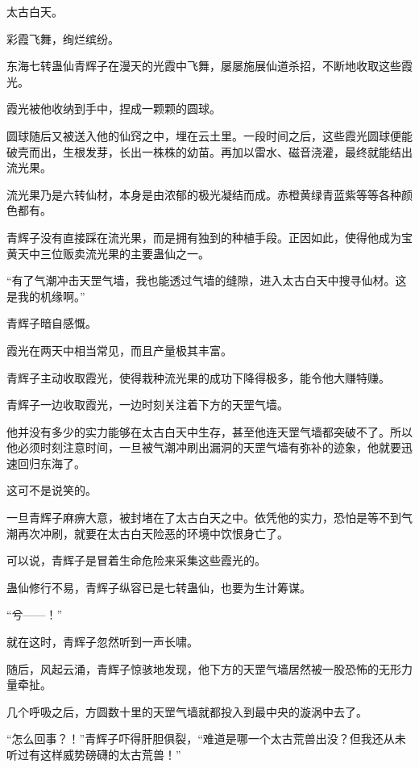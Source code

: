 
\begin{this_body}

太古白天。

彩霞飞舞，绚烂缤纷。

东海七转蛊仙青辉子在漫天的光霞中飞舞，屡屡施展仙道杀招，不断地收取这些霞光。

霞光被他收纳到手中，捏成一颗颗的圆球。

圆球随后又被送入他的仙窍之中，埋在云土里。一段时间之后，这些霞光圆球便能破壳而出，生根发芽，长出一株株的幼苗。再加以雷水、磁音浇灌，最终就能结出流光果。

流光果乃是六转仙材，本身是由浓郁的极光凝结而成。赤橙黄绿青蓝紫等等各种颜色都有。

青辉子没有直接踩在流光果，而是拥有独到的种植手段。正因如此，使得他成为宝黄天中三位贩卖流光果的主要蛊仙之一。

“有了气潮冲击天罡气墙，我也能透过气墙的缝隙，进入太古白天中搜寻仙材。这是我的机缘啊。”

青辉子暗自感慨。

霞光在两天中相当常见，而且产量极其丰富。

青辉子主动收取霞光，使得栽种流光果的成功下降得极多，能令他大赚特赚。

青辉子一边收取霞光，一边时刻关注着下方的天罡气墙。

他并没有多少的实力能够在太古白天中生存，甚至他连天罡气墙都突破不了。所以他必须时刻注意时间，一旦被气潮冲刷出漏洞的天罡气墙有弥补的迹象，他就要迅速回归东海了。

这可不是说笑的。

一旦青辉子麻痹大意，被封堵在了太古白天之中。依凭他的实力，恐怕是等不到气潮再次冲刷，就要在太古白天险恶的环境中饮恨身亡了。

可以说，青辉子是冒着生命危险来采集这些霞光的。

蛊仙修行不易，青辉子纵容已是七转蛊仙，也要为生计筹谋。

“兮——！”

就在这时，青辉子忽然听到一声长啸。

随后，风起云涌，青辉子惊骇地发现，他下方的天罡气墙居然被一股恐怖的无形力量牵扯。

几个呼吸之后，方圆数十里的天罡气墙就都投入到最中央的漩涡中去了。

“怎么回事？！”青辉子吓得肝胆俱裂，“难道是哪一个太古荒兽出没？但我还从未听过有这样威势磅礴的太古荒兽！”


\end{this_body}
